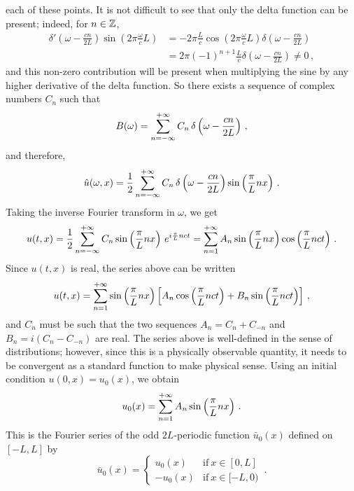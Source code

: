 each of these points. It is not difficult to see that only the delta function can be
present; indeed, for $n\in\mathbb{Z}$,
\begin{align}
  \delta'\left(\omega-\frac{cn}{2L}\right)\sin\left(2\pi\frac{\omega}{c}L\right)&=
  -2\pi\frac{L}{c}\cos\left(2\pi\frac{\omega}{c}L\right)
  \delta\left(\omega-\frac{cn}{2L}\right)\\
  &=2\pi (-1)^{n+1}\frac{L}{c}\delta\left(\omega-\frac{cn}{2L}\right)\neq 0\,,
\end{align}
and this non-zero contribution will be present when multiplying the sine by any higher
derivative of the delta function. So there exists a sequence of complex numbers $C_n$ such
that
\begin{equation}
  B(\omega)=\sum_{n=-\infty}^{+\infty}C_n\,\delta\left(\omega-\frac{cn}{2L}\right)\,,
\end{equation}
and therefore,
\begin{equation}
  \hat{u}(\omega,x)=\frac12\sum_{n=-\infty}^{+\infty}C_n\,\delta\left(\omega-\frac{cn}{2L}\right)\sin\left(\frac{\pi }{L}nx\right)\,.
\end{equation}
Taking the inverse Fourier transform in $\omega$, we get
\begin{equation}
  u(t,x)=\frac12\sum_{n=-\infty}^{+\infty}C_n\sin\left(\frac{\pi }{L}nx\right)\,e^{i\frac{\pi}{L}nct}=
  \sum_{n=1}^{+\infty}A_n\sin\left(\frac{\pi }{L}nx\right)\cos\left(\frac{\pi}{L}nct\right)\,.
\end{equation}
Since $u(t,x)$ is real, the series above can be written
\begin{equation}
  u(t,x)=\sum_{n=1}^{+\infty}\sin\left(\frac{\pi }{L}nx\right)\left[
  A_n\cos\left(\frac{\pi}{L}nct\right)+B_n\sin\left(\frac{\pi}{L}nct\right)\right]\,,
\end{equation}
and $C_n$ must be such that the two sequences $A_n=C_n+C_{-n}$ and $B_n=i(C_{n}-C_{-n})$
are real. The series above is well-defined in the sense of distributions; however, since
this is a physically observable quantity, it needs to be convergent as a standard function
to make physical sense. Using an initial condition $u(0,x)=u_0(x)$, we obtain
\begin{equation}
  u_0(x)=\sum_{n=1}^{+\infty}A_n\sin\left(\frac{\pi }{L}nx\right)\,.
  \label{eq:u0-fourier}
\end{equation}
This is the Fourier series of the odd $2L$-periodic function $\bar{u}_0(x)$ defined on
$[-L,L]$ by
\begin{equation}
  \bar{u}_0(x)=
  \begin{cases}
    u_0(x)&\text{if}~x\in[0,L]\\
    -u_0(x)&\text{if}~x\in[-L,0)
  \end{cases}
  \,.
\end{equation}
